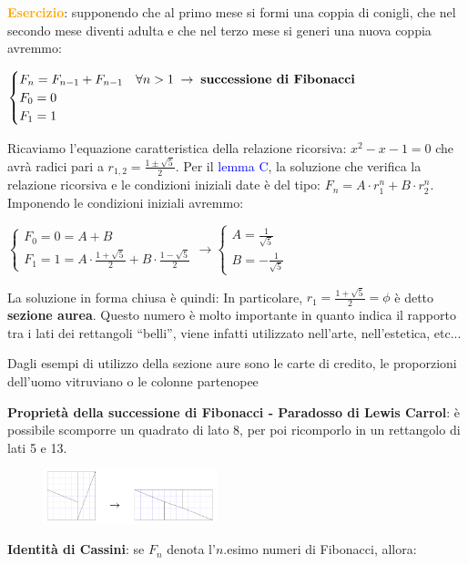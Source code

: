 \begin{flushleft}
    \textcolor{orange}{\textbf{Esercizio}}: supponendo che al primo mese si formi una coppia di conigli, che nel secondo mese diventi adulta e che nel terzo mese si generi una nuova coppia avremmo:

    {\centering
        $\begin{cases}
            F_n = F_{n-1} + F_{n-1} \quad \forall n > 1 \; \rightarrow \; \text{\textbf{successione di Fibonacci}} \\
            F_0 = 0 \\
            F_1 = 1
        \end{cases}$
    \par}
    Ricaviamo l'equazione caratteristica della relazione ricorsiva: $x^2-x-1 = 0$ che avrà radici pari a $r_{1,2} = \frac{1 \pm \sqrt{5}}{2}$. Per il \textcolor{blue}{lemma C}, la soluzione che verifica la relazione ricorsiva e le condizioni iniziali date è del tipo: $F_n = A \cdot r_1^n + B \cdot r_2^n$. Imponendo le condizioni iniziali avremmo:

    {\centering
        $\begin{cases}
            F_0 = 0 = A + B \\
            F_1 = 1 = A \cdot \frac{1 + \sqrt{5}}{2} + B \cdot \frac{1-\sqrt{5}}{2}
        \end{cases}
        \rightarrow
        \begin{cases}
            A = \frac{1}{\sqrt{5}} \\
            B = - \frac{1}{\sqrt{5}}
        \end{cases}$
    \par}
    La soluzione in forma chiusa è quindi: 
    In particolare, $r_1 = \frac{1+\sqrt{5}}{2} = \phi$ è detto \textbf{sezione aurea}. Questo numero è molto importante in quanto indica il rapporto tra i lati dei rettangoli ``belli'', viene infatti utilizzato nell'arte, nell'estetica, etc... 

    Dagli esempi di utilizzo della sezione aure sono le carte di credito, le proporzioni dell'uomo vitruviano o le colonne partenopee

    \textbf{Proprietà della successione di Fibonacci - Paradosso di Lewis Carrol}: è possibile scomporre un quadrato di lato 8, per poi ricomporlo in un rettangolo di lati 5 e 13.
    
    \begin{figure}[h]
        \centering
        \includegraphics[width=0.45\textwidth]{img/fibonacci}
    \end{figure}
    \textbf{Identità di Cassini}: se $F_n$ denota l'$n$.esimo numeri di Fibonacci, allora: 


\end{flushleft}
